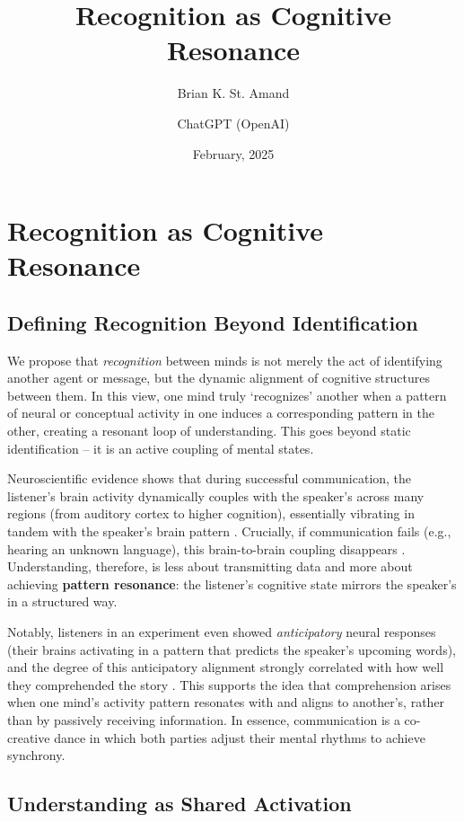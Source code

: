 \documentclass{article}
\title{Recognition as Cognitive Resonance}
\author{Brian K. St. Amand \and ChatGPT (OpenAI)}
\date{February, 2025}
\begin{document}
\maketitle

\section{Recognition as Cognitive Resonance}

\subsection{Defining Recognition Beyond Identification}

We propose that \emph{recognition} between minds is not merely the act of identifying another agent or message, but the dynamic alignment of cognitive structures between them. In this view, one mind truly `recognizes' another when a pattern of neural or conceptual activity in one induces a corresponding pattern in the other, creating a resonant loop of understanding. This goes beyond static identification -- it is an active coupling of mental states.

Neuroscientific evidence shows that during successful communication, the listener's brain activity dynamically couples with the speaker's across many regions (from auditory cortex to higher cognition), essentially vibrating in tandem with the speaker's brain pattern \citep{stephens2010}. Crucially, if communication fails (e.g., hearing an unknown language), this brain-to-brain coupling disappears \citep{stephens2010}. Understanding, therefore, is less about transmitting data and more about achieving \textbf{pattern resonance}: the listener's cognitive state mirrors the speaker's in a structured way.

Notably, listeners in an experiment even showed \emph{anticipatory} neural responses (their brains activating in a pattern that predicts the speaker's upcoming words), and the degree of this anticipatory alignment strongly correlated with how well they comprehended the story \citep{stephens2010}. This supports the idea that comprehension arises when one mind's activity pattern resonates with and aligns to another's, rather than by passively receiving information. In essence, communication is a co-creative dance in which both parties adjust their mental rhythms to achieve synchrony.

\subsection{Understanding as Shared Activation}
\end{document}
